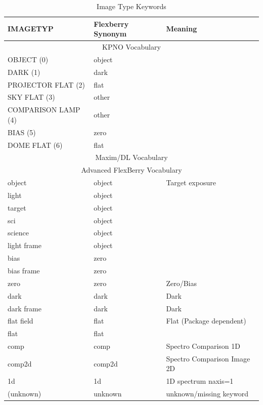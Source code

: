 \begin{table}[h!]
\centering
\begin{tabular}{ l  l  l }
\hline
IMAGETYP         & Flexberry Synonym   & Meaning            \\
\hline
\multicolumn{3}{c}{KPNO Vocabulary}                         \\
\hline
OBJECT (0)           & object          &                    \\
DARK (1)             & dark            &                    \\
PROJECTOR FLAT (2)   & flat            &                    \\
SKY FLAT (3)         & other           &                    \\
COMPARISON LAMP (4)  & other           &                    \\
BIAS (5)             & zero            &                    \\
DOME FLAT (6)        & flat            &                    \\
\hline
\multicolumn{3}{c}{Maxim/DL Vocabulary}                     \\
\hline
\multicolumn{3}{c}{Advanced FlexBerry Vocabulary}           \\
object               & object          & Target exposure    \\
light                & object          &                    \\
target               & object          &                    \\
sci                  & object          &                    \\
science              & object          &                    \\
light frame          & object          &                    \\
bias                 & zero            &                    \\
bias frame           & zero            &                    \\
zero                 & zero            & Zero/Bias          \\
dark                 & dark            & Dark               \\
dark frame           & dark            & Dark               \\
flat field           & flat            & Flat (Package dependent) \\
flat                 & flat            &                    \\
comp                 & comp            & Spectro Comparison 1D \\
comp2d               & comp2d          & Spectro Comparison Image 2D \\
1d                   & 1d              & 1D spectrum naxis=1 \\
(unknown)            & unknown         & unknown/missing keyword \\
\hline
\end{tabular}
\caption{Image Type Keywords}
\label{table:ImageTypeKeywords}
\end{table}
\clearpage
